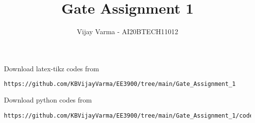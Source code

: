 \documentclass[journal,12pt,twocolumn]{IEEEtran}
\DeclareMathOperator*{\Res}{Res}
\begin{document}
\newcommand{\BEQA}{\begin{eqnarray}}
\newcommand{\EEQA}{\end{eqnarray}}
\newcommand{\define}{\stackrel{\triangle}{=}}

\raggedbottom
\setlength{\parindent}{0pt}
\providecommand{\mbf}{\mathbf}
\providecommand{\pr}[1]{\ensuremath{\Pr\left(#1\right)}}
\providecommand{\qfunc}[1]{\ensuremath{Q\left(#1\right)}}
\providecommand{\sbrak}[1]{\ensuremath{{}\left[#1\right]}}
\providecommand{\lsbrak}[1]{\ensuremath{{}\left[#1\right.}}
\providecommand{\rsbrak}[1]{\ensuremath{{}\left.#1\right]}}
\providecommand{\brak}[1]{\ensuremath{\left(#1\right)}}
\providecommand{\lbrak}[1]{\ensuremath{\left(#1\right.}}
\providecommand{\rbrak}[1]{\ensuremath{\left.#1\right)}}
\providecommand{\cbrak}[1]{\ensuremath{\left\{#1\right\}}}
\providecommand{\lcbrak}[1]{\ensuremath{\left\{#1\right.}}
\providecommand{\rcbrak}[1]{\ensuremath{\left.#1\right\}}}
\theoremstyle{remark}
\newtheorem{rem}{Remark}
\newcommand{\sgn}{\mathop{\mathrm{sgn}}}
\providecommand{\abs}[1]{\vert#1\vert}
\providecommand{\res}[1]{\Res\displaylimits_{#1}} 
\providecommand{\norm}[1]{\lVert#1\rVert}
\providecommand{\mtx}[1]{\mathbf{#1}}
\providecommand{\mean}[1]{E[ #1 ]}
\providecommand{\fourier}{\overset{\mathcal{F}}{ \rightleftharpoons}}
\providecommand{\system}{\overset{\mathcal{H}}{ \longleftrightarrow}}
\newcommand{\solution}{\noindent \textbf{Solution: }}
\newcommand{\cosec}{\,\text{cosec}\,}
\providecommand{\dec}[2]{\ensuremath{\overset{#1}{\underset{#2}{\gtrless}}}}
\newcommand{\myvec}[1]{\ensuremath{\begin{pmatrix}#1\end{pmatrix}}}
\newcommand{\mydet}[1]{\ensuremath{\begin{vmatrix}#1\end{vmatrix}}}
\makeatletter
{}
\makeatother
\let\StandardTheFigure\thefigure
\let\vec\mathbf
\renewcommand{\thefigure}{\theproblem}
\def\putbox#1#2#3{\makebox[0in][l]{\makebox[#1][l]{}\raisebox{\baselineskip}[0in][0in]{\raisebox{#2}[0in][0in]{#3}}}}
     \def\rightbox#1{\makebox[0in][r]{#1}}
     \def\centbox#1{\makebox[0in]{#1}}
     \def\topbox#1{\raisebox{-\baselineskip}[0in][0in]{#1}}
     \def\midbox#1{\raisebox{-0.5\baselineskip}[0in][0in]{#1}}
\vspace{3cm}
\title{\textbf{Gate Assignment 1}}
\author{Vijay Varma - AI20BTECH11012}
\maketitle
\newpage
\bigskip
\renewcommand{\thefigure}{\theenumi}
\renewcommand{\thetable}{\theenumi}
%
Download latex-tikz codes from 
%
\begin{lstlisting}
https://github.com/KBVijayVarma/EE3900/tree/main/Gate_Assignment_1
\end{lstlisting}
Download python codes from 
%
\begin{lstlisting}
https://github.com/KBVijayVarma/EE3900/tree/main/Gate_Assignment_1/code
\end{lstlisting}
\end{document}
